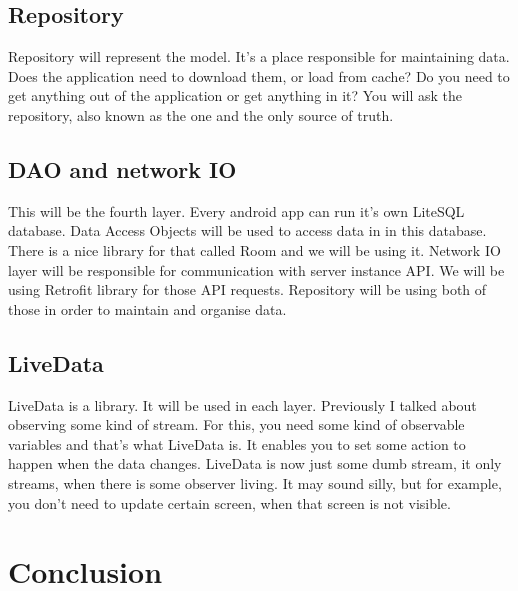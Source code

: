 \subsection{Repository}
Repository will represent the model.
It's a place responsible for maintaining data.
Does the application need to download them, or load from cache?
Do you need to get anything out of the application or get anything in it?
You will ask the repository, also known as the one and the only source of truth.

\subsection{DAO and network IO}
This will be the fourth layer.
Every android app can run it's own LiteSQL database.
Data Access Objects will be used to access data in in this database.
There is a nice library for that called Room and we will be using it.
Network IO layer will be responsible for communication with server instance API.
We will be using Retrofit library for those API requests.
Repository will be using both of those in order to maintain and organise data.

\subsection{LiveData}
LiveData is a library.
It will be used in each layer.
Previously I talked about observing some kind of stream.
For this, you need some kind of observable variables and that's what LiveData is.
It enables you to set some action to happen when the data changes.
LiveData is now just some dumb stream, it only streams, when there is some observer living.
It may sound silly, but for example, you don't need to update certain screen, when that screen is not visible.

\section{Conclusion}

